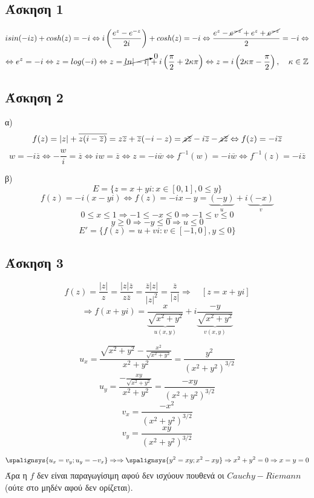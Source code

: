 \documentclass[12pt]{article}
\begin{document}
 \subsection{Άσκηση 1}
$$
isin(-iz)+cosh(z)=-i \Leftrightarrow
i\left(\frac{e^z-e^{-z}}{2i}
\right)+cosh(z)=-i \Leftrightarrow
\frac{e^z-\cancel{e^{-z}}+e^z+\cancel{e^{-z}}}{2}=-i \Leftrightarrow
$$
$$
\Leftrightarrow e^z=-i \Leftrightarrow z = log(-i) 
\Leftrightarrow
z=\cancelto{0}{ln|-i|}+i\left( \frac{\pi}{2}+2\kappa \pi \right) \Leftrightarrow z=i\left(2\kappa \pi - \frac{\pi}{2} \right), \quad
\kappa \in \mathbb{Z}
$$

 \subsection{Άσκηση 2}
α)
$$
f(z)=|z|+\overline{z(i-\overline{z})}=z\overline{z}+\overline{z}(-i-z)=\cancel{z\overline{z}}-i\overline{z}-
\cancel{z\overline{z}} \Leftrightarrow f(z)=-i\overline{z}
$$
$$
w=-i\overline{z} \Leftrightarrow -\frac{w}{i} = \overline{z} \Leftrightarrow iw=\overline{z}\Leftrightarrow z=-i\overline{w} \Leftrightarrow
f^{-1}(w)=-i\overline{w}\Leftrightarrow
f^{-1}(z)=-i\overline{z}
$$

β)
$$
Ε= \{ 
z=x+yi : x \in [0,1] , 0\leqslant y
\}
$$
$$
f(z)=-i(x-yi)\Leftrightarrow f(z)=-ix-y=\underbrace{(-y)}_{\text{$u$}}+i\underbrace{(-x)}_{\text{$v$}}
$$
$$
0\leqslant x \leqslant 1 \Rightarrow -1\leqslant -x \leqslant 0 \Rightarrow -1 \leqslant v \leqslant 0
$$
$$
y \geqslant 0 \Rightarrow -y \leqslant 0 \Rightarrow u \leqslant 0
$$
$$
Ε'= \{ 
f(z)=u+vi : v \in [-1,0] , y\leqslant 0
\}
$$

\newpage

 \subsection{Άσκηση 3}
$$
f(z)=\frac{|z|}{z}= \frac{|z|\overline{z}}{z\overline{z}}
= \frac{\overline{z}|z|}{|z|^2}=\frac{\overline{z}}{|z|}
\Rightarrow \quad[z=x+yi] 
$$
$$
\Rightarrow f(x+yi)=\underbrace{\frac{x}{\sqrt{x^2+y^2}}}_{\text{$u(x,y)$}}+i
\underbrace{\frac{-y}{\sqrt{x^2+y^2}}}_{\text{$v(x,y)$}}
$$

$$u_x=\frac{\sqrt{x^2+y^2}-\frac{x^2}{\sqrt{x^2+y^2}}}{x^2+y^2}=\frac{y^2}{(x^2+y^2)^{3/2}}
$$
$$u_y=\frac{- \frac{xy}{\sqrt{x^2+y^2}}}{x^2+y^2}=
\frac{-xy}{(x^2+y^2)^{3/2}}
$$
$$v_x=\frac{-x^2}{(x^2+y^2)^{3/2}}
$$
$$
v_y= \frac{xy}{(x^2+y^2)^{3/2}}
$$


\[
\spalignsys {u_x=v_y;u_y=-v_x} \Rightarrow  
\Rightarrow
\spalignsys
{y^2=xy;
x^2-xy} \Rightarrow
x^2+y^2=0 \Rightarrow x = y = 0 
\]
Άρα η $f$ δεν είναι παραγωγίσιμη αφού δεν ισχύουν πουθενά οι $Cauchy-Riemann$ (ούτε στο μηδέν αφού δεν ορίζεται).
\end{document}
